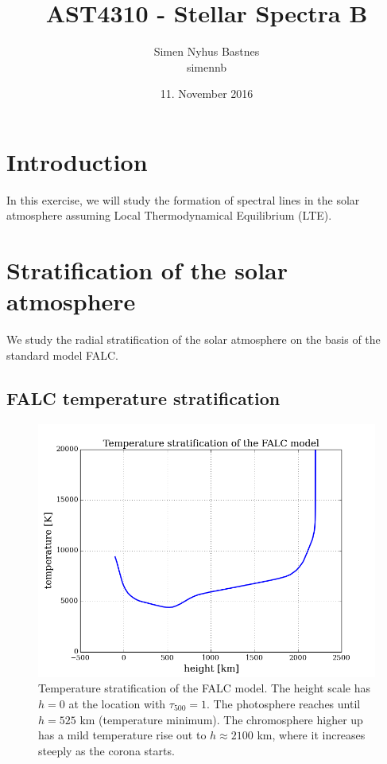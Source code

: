 \documentclass{article}
\title{AST4310 - Stellar Spectra B}
\author{Simen Nyhus Bastnes\\simennb}
\date{11. November 2016}
\begin{document}
\maketitle
\section*{Introduction}
In this exercise, we will study the formation of spectral lines in the solar atmosphere assuming Local Thermodynamical Equilibrium (LTE).
\section{Stratification of the solar atmosphere}
We study the radial stratification of the solar atmosphere on the basis of the standard model FALC.
\subsection{FALC temperature stratification}
\begin{figure}[H]
  \centering
  \includegraphics[scale=0.5]{../figures/falc/falc_h_temp.png}
  \caption{Temperature stratification of the FALC model. The height scale has $h=0$ at the location with $\tau_{500} = 1$. The photosphere reaches until $h=525$ km (temperature minimum). The chromosphere higher up has a mild temperature rise out to $h \approx 2100$ km, where it increases steeply as the corona starts.}
  \label{fig:falc_temp}
\end{figure}
\end{document}
